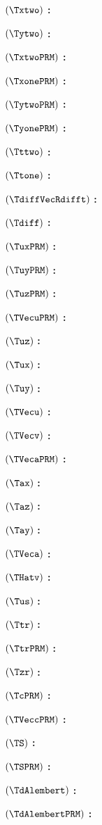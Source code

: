 $( \Txtwo )$ \textbf{:} \Txtwodef

$( \Tytwo )$ \textbf{:} \Tytwodef

$( \TxtwoPRM )$ \textbf{:} \TxtwoPRMdef

$( \TxonePRM )$ \textbf{:} \TxonePRMdef

$( \TytwoPRM )$ \textbf{:} \TytwoPRMdef

$( \TyonePRM )$ \textbf{:} \TyonePRMdef

$( \Tttwo )$ \textbf{:} \Tttwodef

$( \Ttone )$ \textbf{:} \Ttonedef

$( \TdiffVecRdifft )$ \textbf{:} \TdiffVecRdifftdef

$( \Tdiff )$ \textbf{:} \Tdiffdef

$( \TuxPRM )$ \textbf{:} \TuxPRMdef

$( \TuyPRM )$ \textbf{:} \TuyPRMdef

$( \TuzPRM )$ \textbf{:} \TuzPRMdef

$( \TVecuPRM )$ \textbf{:} \TVecuPRMdef

$( \Tuz )$ \textbf{:} \Tuzdef

$( \Tux )$ \textbf{:} \Tuxdef

$( \Tuy )$ \textbf{:} \Tuydef

$( \TVecu )$ \textbf{:} \TVecudef

$( \TVecv )$ \textbf{:} \TVecvdef

$( \TVecaPRM )$ \textbf{:} \TVecaPRMdef

$( \Tax )$ \textbf{:} \Taxdef

$( \Taz )$ \textbf{:} \Tazdef

$( \Tay )$ \textbf{:} \Taydef

$( \TVeca )$ \textbf{:} \TVecadef

$( \THatv )$ \textbf{:} \THatvdef

$( \Tus )$ \textbf{:} \Tusdef

$( \Ttr )$ \textbf{:} \Ttrdef

$( \TtrPRM )$ \textbf{:} \TtrPRMdef

$( \Tzr )$ \textbf{:} \Tzrdef

$( \TcPRM )$ \textbf{:} \TcPRMdef

$( \TVeccPRM )$ \textbf{:} \TVeccPRMdef

$( \TS )$ \textbf{:} \TSdef

$( \TSPRM )$ \textbf{:} \TSPRMdef

$( \TdAlembert )$ \textbf{:} \TdAlembertdef

$( \TdAlembertPRM )$ \textbf{:} \TdAlembertPRMdef

